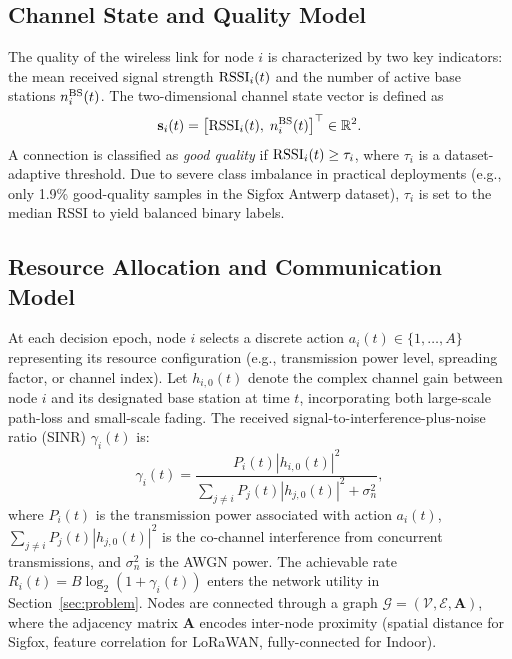 \documentclass[conference]{IEEEtran}
\begin{document}
\subsection{Channel State and Quality Model}

The quality of the wireless link for node $i$ is characterized by two
key indicators: the mean received signal strength ${\rm RSSI}_i(t)$
and the number of active base stations $n^{\rm BS}_i(t)$. The
two-dimensional channel state vector is defined as
\begin{equation}
\mathbf{s}_i(t) = \bigl[{\rm RSSI}_i(t),\; n^{\rm BS}_i(t)\bigr]^\top
\in \mathbb{R}^2.
\label{eq:channel_state}
\end{equation}
A connection is classified as \emph{good quality} if
${\rm RSSI}_i(t) \geq \tau_i$, where $\tau_i$ is a dataset-adaptive
threshold. Due to severe class imbalance in practical deployments
(e.g., only 1.9\% good-quality samples in the Sigfox Antwerp dataset),
$\tau_i$ is set to the median RSSI to yield balanced binary labels.

\subsection{Resource Allocation and Communication Model}

At each decision epoch, node $i$ selects a discrete action
$a_i(t)\in\{1,\ldots,A\}$ representing its resource configuration
(e.g., transmission power level, spreading factor, or channel index).
Let $h_{i,0}(t)$ denote the complex channel gain between node $i$ and
its designated base station at time $t$, incorporating both large-scale
path-loss and small-scale fading. The received
signal-to-interference-plus-noise ratio (SINR) $\gamma_i(t)$ is:
\begin{equation}
\gamma_i(t) = \frac{P_i(t) |h_{i,0}(t)|^2}{\displaystyle\sum_{j \neq i} P_j(t) |h_{j,0}(t)|^2 + \sigma_n^2},
\label{eq:sinr_v0}
\end{equation}
where $P_i(t)$ is the transmission power associated with action $a_i(t)$,
$\sum_{j \neq i} P_j(t)|h_{j,0}(t)|^2$ is the co-channel interference from
concurrent transmissions, and $\sigma_n^2$ is the AWGN power. The achievable
rate $R_i(t)=B\log_2(1+\gamma_i(t))$ enters the network utility in
Section~\ref{sec:problem}. Nodes are connected through a graph
$\mathcal{G}=(\mathcal{V},\mathcal{E},\mathbf{A})$, where the adjacency
matrix $\mathbf{A}$ encodes inter-node proximity (spatial distance for
Sigfox, feature correlation for LoRaWAN, fully-connected for Indoor).
\end{document}
